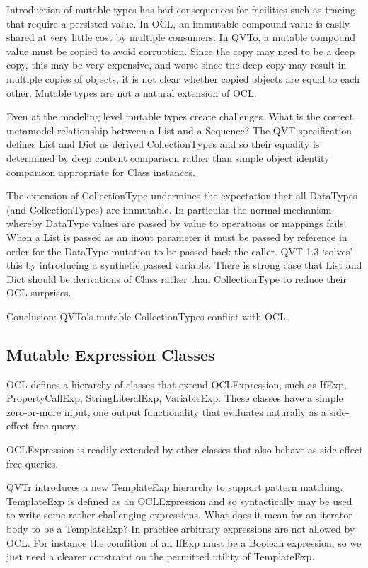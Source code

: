 \documentclass{llncs}
\begin{document}
Introduction of mutable types has bad consequences for facilities such as tracing that require a persisted value. In OCL, an immutable compound value is easily shared at very little cost by multiple consumers. In QVTo, a mutable compound value must be copied to avoid corruption. Since the copy may need to be a deep copy,  this may be very expensive, and worse since the deep copy may result in multiple copies of objects, it is not clear whether copied objects are equal to each other. Mutable types are not a natural extension of OCL.

Even at the modeling level mutable types create challenges. What is the correct metamodel relationship between a List and a Sequence? The QVT specification defines List and Dict as derived CollectionTypes and so their equality is determined by deep content comparison rather than simple object identity comparison appropriate for Class instances.

The extension of CollectionType undermines the expectation that all DataTypes (and CollectionTypes) are immutable. In particular the normal mechanism whereby DataType values are passed by value to operations or mappings fails. When a List is passed as an inout parameter it must be passed by reference in order for the DataType mutation to be passed back the caller. QVT 1.3 `solves' this by introducing a synthetic passed variable. There is strong case that List and Dict should be derivations of Class rather than CollectionType to reduce their OCL surprises.

Conclusion: QVTo's mutable CollectionTypes conflict with OCL.

\subsection{Mutable Expression Classes}
  
OCL defines a hierarchy of classes that extend OCLExpression, such as IfExp, PropertyCallExp, StringLiteralExp, VariableExp. These classes have a simple zero-or-more input, one output functionality that evaluates naturally as a side-effect free query.

OCLExpression is readily extended by other classes that also behave as side-effect free queries.

QVTr introduces a new TemplateExp hierarchy to support pattern matching. TemplateExp is defined as an OCLExpression and so syntactically may be used to write some rather challenging expressions. What does it mean for an iterator body to be a TemplateExp? In practice arbitrary expressions are not allowed by OCL. For instance the condition of an IfExp must be a Boolean expression, so we just need a clearer constraint on the permitted utility of TemplateExp.
\end{document}
